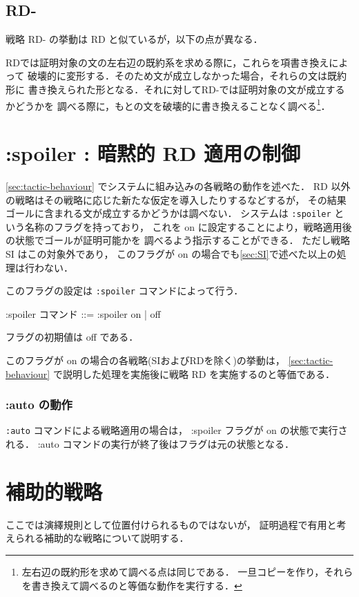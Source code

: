 \documentclass[a4paper,oneside,10pt,here]{memoir}
\newenvironment{vvtm}%
{\parskip=0pt\lineskip=0pt\begin{center}\begin{minipage}{0.8\textwidth}\begin{snugshade}}%
  {\end{snugshade}\end{minipage}\end{center}}
\begin{document}
\subsection{RD-} \label{sec:rd-}
戦略 RD- の挙動は RD と似ているが，以下の点が異なる．

RDでは証明対象の文の左右辺の既約系を求める際に，これらを項書き換えによって
破壊的に変形する．そのため文が成立しなかった場合，それらの文は既約形に
書き換えられた形となる．それに対してRD-では証明対象の文が成立するかどうかを
調べる際に，もとの文を破壊的に書き換えることなく調べる\footnote{左右辺の既約形を求めて調べる点は同じである．
一旦コピーを作り，それらを書き換えて調べるのと等価な動作を実行する．}．

\section{:spoiler : 暗黙的 RD 適用の制御} \label{sec:spoiler-flag}

\ref{sec:tactic-behaviour} でシステムに組み込みの各戦略の動作を述べた．
RD 以外の戦略はその戦略に応じた新たな仮定を導入したりするなどするが，
その結果ゴールに含まれる文が成立するかどうかは調べない．
システムは \verb|:spoiler| という名称のフラグを持っており，
これを on に設定することにより，戦略適用後の状態でゴールが証明可能かを%
調べるよう指示することができる．
ただし戦略 SI はこの対象外であり，
このフラグが on の場合でも\ref{sec:SI}で述べた以上の処理は行わない．

このフラグの設定は \verb|:spoiler| コマンドによって行う．
  \begin{vvtm}
    \begin{simplev}
  :spoiler コマンド ::= :spoiler { on | off }
    \end{simplev}
  \end{vvtm}

フラグの初期値は off である．

このフラグが on の場合の各戦略(SIおよびRDを除く)の挙動は，%
\ref{sec:tactic-behaviour} で説明した処理を実施後に戦略 RD を実施するのと等価である．

\subsubsection{:auto の動作}\label{sec:auto-and-spoiler}
\texttt{:auto} コマンドによる戦略適用の場合は，
:spoiler フラグが on の状態で実行される．
:auto コマンドの実行が終了後はフラグは元の状態となる．

\section{補助的戦略}\label{sec:suppliment}
ここでは演繹規則として位置付けられるものではないが，
証明過程で有用と考えられる補助的な戦略について説明する．
\end{document}
